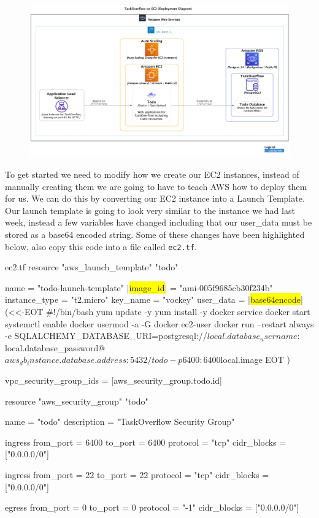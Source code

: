 \documentclass{csse4400}
\begin{document}
\begin{figure}[H]
  \includegraphics[width=\textwidth]{diagrams/ec2deployment}
\end{figure}

To get started we need to modify how we create our EC2 instances, instead of manually creating them we are going to have to teach AWS how to deploy them for us. We can do this by converting our EC2 instance into a Launch Template. Our launch template is going to look very similar to the instance we had last week, instead a few variables have changed including that our user\_data must be stored as a base64 encoded string. Some of these changes have been highlighted below, also copy this code into a file called \texttt{ec2.tf}.


\begin{code}[language=terraform,numbers=none,escapechar=|,keepspaces=true]{ec2.tf}
resource "aws_launch_template" "todo" {
  name          = "todo-launch-template"
  |\colorbox{yellow}{image\_id}|     = "ami-005f9685cb30f234b"
  instance_type = "t2.micro"
  key_name      = "vockey"
  user_data     = |\colorbox{yellow}{base64encode}|(<<-EOT
    #!/bin/bash
    yum update -y
    yum install -y docker
    service docker start
    systemctl enable docker
    usermod -a -G docker ec2-user 
    docker run --restart always -e SQLALCHEMY_DATABASE_URI=postgresql://${local.database_username}:${local.database_password}@${aws_db_instance.database.address}:5432/todo -p 6400:6400 ${local.image}
EOT
  )

  vpc_security_group_ids = [aws_security_group.todo.id]
}


resource "aws_security_group" "todo" {
  name          = "todo"
  description   = "TaskOverflow Security Group"

  ingress {
    from_port   = 6400
    to_port     = 6400
    protocol    = "tcp"
    cidr_blocks = ["0.0.0.0/0"]
  }

  ingress {
    from_port   = 22
    to_port     = 22
    protocol    = "tcp"
    cidr_blocks = ["0.0.0.0/0"]
  }

  egress {
    from_port   = 0
    to_port     = 0
    protocol    = "-1"
    cidr_blocks = ["0.0.0.0/0"]
  }
}
\end{code}
\end{document}
